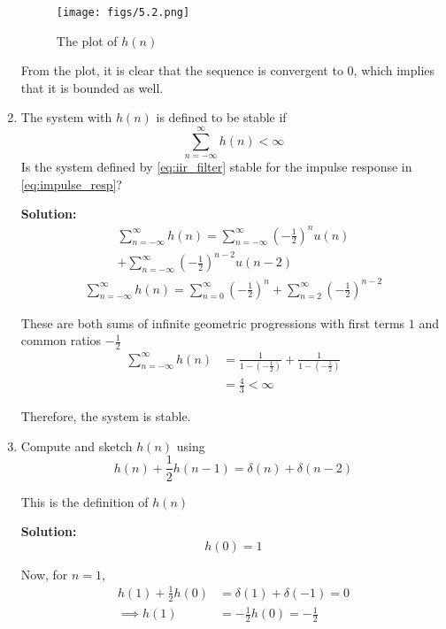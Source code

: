 \documentclass[journal,12pt,twocolumn]{IEEEtran}
\newcommand{\solution}{\noindent \textbf{Solution: }}
\providecommand{\brak}[1]{\ensuremath{\left(#1\right)}}
\numberwithin{equation}{section}
\renewcommand\thesection{\arabic{section}}
\begin{document}
\begin{enumerate}[label=\thesection.\arabic*]
	\begin{figure}[!ht]
		\centering
		\texttt{[image: figs/5.2.png]}
		\caption{The plot of $h(n)$}
		\label{fig-5.2}	
	\end{figure}
	
	From the plot, it is clear that the sequence is convergent to $0$, which implies that it is bounded as well.
	
	\item The system with $h(n)$ is defined to be stable if
	\begin{equation}
		\sum_{n=-\infty}^{\infty}h(n) < \infty
	\end{equation}
	Is the system defined by \eqref{eq:iir_filter} stable for the impulse response in \eqref{eq:impulse_resp}?	
	
	\solution
	\begin{multline}
		\sum_{n=-\infty}^{\infty}h(n) = \sum_{n=-\infty}^{\infty} \brak{-\frac12}^n u(n) \\
		+ \sum_{n=-\infty}^{\infty} \brak{-\frac12}^{n-2} u(n-2)
	\end{multline}
	\begin{align}
		\sum_{n=-\infty}^{\infty}h(n) = \sum_{n=0}^{\infty}\brak{-\frac12}^n + \sum_{n=2}^{\infty}\brak{-\frac12}^{n-2}
	\end{align}
	
	These are both sums of infinite geometric progressions with first terms $1$ and common ratios $-\frac12$
	\begin{align}
		\sum_{n=-\infty}^{\infty}h(n) &= \frac{1}{1 - \brak{-\frac12}} + \frac{1}{1 - \brak{-\frac12}} \\
		&= \frac{4}{3} < \infty
	\end{align}
	
	Therefore, the system is stable.
	
	\item Compute and sketch $h(n)$ using 
	\begin{equation}
		\label{eq:iir_filter_h}
		h(n) + \dfrac{1}{2}h(n-1) = \delta(n) + \delta(n-2)
	\end{equation}

	This is the definition of $h(n)$
	
	\solution 
	\begin{equation}
		h(0) = 1
	\end{equation}
	
	Now, for $n = 1$,
	\begin{align}
		h(1) + \frac12 h(0) &= \delta(1) + \delta(-1) = 0 \\
		\implies h(1) &= - \frac{1}{2} h(0) = -\frac{1}{2}
	\end{align}
	

\end{enumerate}
\end{document}

